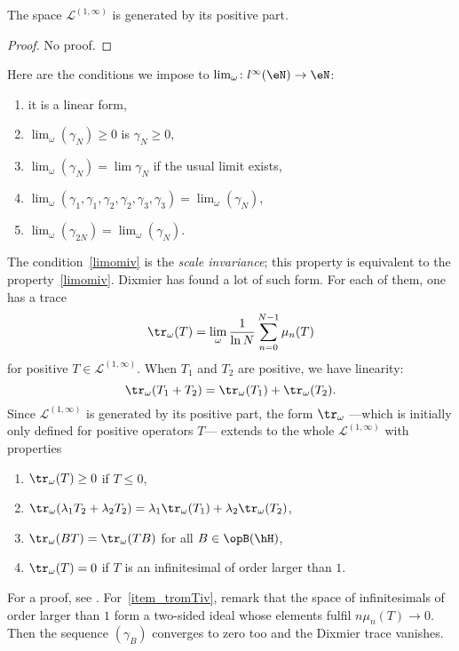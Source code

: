 \begin{proposition}
	The space $\mathscr{L}^{(1,\infty)}$ is generated by its positive part.
\end{proposition}
\begin{proof}
	No proof.
\end{proof}
Here are the conditions we impose to $\lim_{\omega}\colon l^{\infty}(\eN)\to \eN$:
\begin{enumerate}
	\item it is a linear form,
	\item $\lim_{\omega}(\gamma_N)\geq 0$ is $\gamma_N\geq0$,
	\item $\lim_{\omega}(\gamma_N)=\lim\gamma_N$ if the usual limit exists,
	      \item\label{limomiii}$\lim_{\omega}(\gamma_1,\gamma_1,\gamma_2,\gamma_2,\gamma_3,\gamma_3)=\lim_{\omega}(\gamma_N)$,
	      \item\label{limomiv} $\lim_{\omega}(\gamma_{2N})=\lim_{\omega}(\gamma_N)$.
\end{enumerate}
The condition~\ref{limomiv} is the \emph{scale invariance}; this property is equivalent to the property~\ref{limomiv}. Dixmier has found a lot of such form. For each of them, one has a trace
\begin{equation}
	\tr_{\omega}(T)=\lim_{\omega}\frac{1}{ \ln N }\sum_{n=0}^{N-1}\mu_n(T)
\end{equation}
for positive $T\in\mathscr{L}^{(1,\infty)}$. When $T_1$ and $T_2$ are positive, we have linearity:
\[
	\tr_{\omega}(T_1+T_2)=\tr_{\omega}(T_1)+\tr_{\omega}(T_2).
\]
Since $\mathscr{L}^{(1,\infty)}$ is generated by its positive part, the form $\tr_{\omega}$ ---which is initially only defined for positive operators $T$--- extends to the whole $\mathscr{L}^{(1,\infty)}$ with properties
\begin{enumerate}
	\item $\tr_{\omega}(T)\geq0$ if $T\leq0$,
	\item $\tr_{\omega}(\lambda_1T_2+\lambda_2 T_2)=\lambda_1\tr_{\omega}(T_1)+\lambda_2\tr_{\omega}(T_2)$,
	\item $\tr_{\omega}(BT)=\tr_{\omega}(TB)$ for all $B\in\opB(\hH)$,
	      \item\label{item_tromTiv} $\tr_{\omega}(T)=0$ if $T$ is an infinitesimal of order larger than $1$.
\end{enumerate}
For a proof, see \cite{Landi}. For~\ref{item_tromTiv}, remark that the space of infinitesimals of order larger than $1$ form a two-sided ideal whose elements fulfil $n\mu_n(T)\to 0$. Then the sequence $(\gamma_B)$ converges to zero too and the Dixmier trace vanishes.


